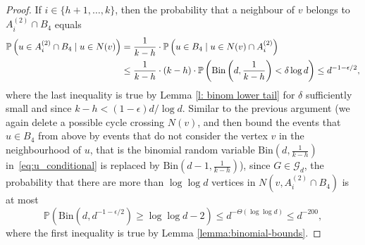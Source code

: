 \documentclass[notitlepage]{scrartcl}
\renewcommand{\Pr}{\mathbb{P}}
\begin{document}
\begin{proof}
    If $i \in \{h+1,\ldots,k\}$, then the probability that a neighbour of $v$ belongs to $A_i^{(2)} \cap B_4$ equals
    \begin{align}
        \Pr\left(u \in A_i^{(2)} \cap B_4 \mid u \in N(v)\right) &= \frac{1}{k - h} \cdot \Pr\left(u \in B_4 \mid u \in N(v) \cap A_i^{(2)}\right)\notag \\
        &\le \frac{1}{k - h} \cdot (k-h) \cdot \Pr\left(\text{Bin}\left(d, \frac{1}{k - h}\right) < \delta \log d\right) \le d^{-1 - \epsilon/2},   
    \label{eq:u_conditional}
    \end{align}
    where %
     the last inequality is true by Lemma \ref{l: binom lower tail} for $\delta$ sufficiently small and since $k-h< (1-\epsilon)d/\log d$. Similar to the previous argument (we again delete a possible cycle crossing $N(v)$, and then bound the events that $u\in B_4$ from above by events that do not consider the vertex $v$ in the neighbourhood of $u$, that is the binomial random variable $\text{Bin}\left(d, \frac{1}{k - h}\right)$ in~\eqref{eq:u_conditional} is replaced by $\text{Bin}\left(d-1, \frac{1}{k - h}\right)$), since $G \in \mathcal{G}_d$, the probability that there are more than $\log \log d$ vertices in $N(v, A_i^{(2)} \cap B_4)$ is at most
    \[
        \Pr\left(\text{Bin}\left(d, d^{-1 - \epsilon/2}\right) \ge \log \log d - 2\right) \le d^{-\Theta(\log \log d)} \le d^{-200},
    \]
    where the first inequality is true by Lemma \ref{lemma:binomial-bounds}. 
\end{proof}
\end{document}
